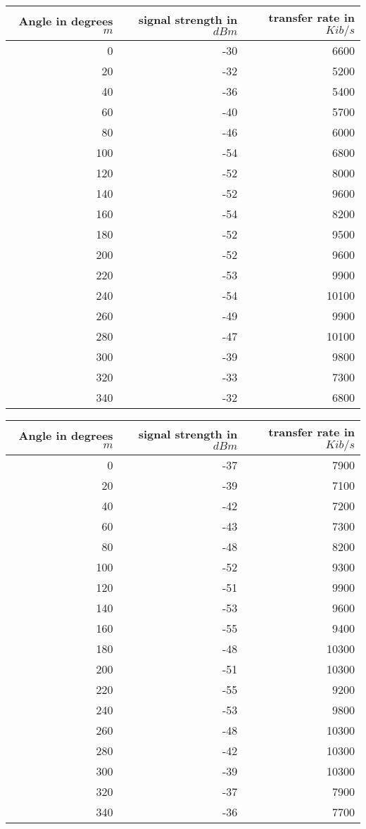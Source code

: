\begin{table}
	\begin{center}
		\begin{tabular}{r|r|r}\
			Angle in degrees $m$ & signal strength in $dBm$ & transfer rate in $Kib/s$\\
			\hline 
			0 & -30 & 6600\\
			20 & -32 & 5200\\
			40 & -36 & 5400\\
			60 & -40 & 5700\\
			80 & -46 & 6000\\
			100 & -54 & 6800\\
			120 & -52 & 8000\\
			140 & -52 & 9600\\
			160 & -54 & 8200\\
			180 & -52 & 9500\\
			200 & -52 & 9600\\
			220 & -53 & 9900\\
			240 & -54 & 10100\\
			260 & -49 & 9900\\
			280 & -47 & 10100\\
			300 & -39 & 9800\\
			320 & -33 & 7300\\
			340 & -32 & 6800\\
		\end{tabular}
	\end{center}
\end{table}

\begin{table}
	\begin{center}
		\begin{tabular}{r|r|r}\
			Angle in degrees $m$ & signal strength in $dBm$ & transfer rate in $Kib/s$\\
			\hline 
			0 & -37 & 7900\\
			20 & -39 & 7100\\
			40 & -42 & 7200\\
			60 & -43 & 7300\\
			80 & -48 & 8200\\
			100 & -52 & 9300\\
			120 & -51 & 9900\\
			140 & -53 & 9600\\
			160 & -55 & 9400\\
			180 & -48 & 10300\\
			200 & -51 & 10300\\
			220 & -55 & 9200\\
			240 & -53 & 9800\\
			260 & -48 & 10300\\
			280 & -42 & 10300\\
			300 & -39 & 10300\\
			320 & -37 & 7900\\
			340 & -36 & 7700\\
		\end{tabular}
	\end{center}
\end{table}

